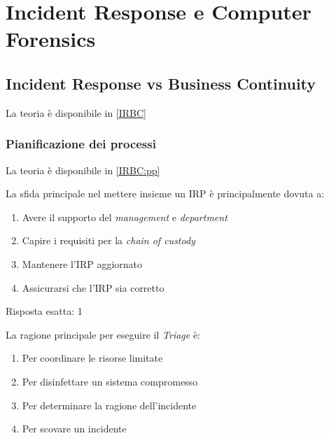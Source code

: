 \chapter{Incident Response e Computer Forensics}
\section{Incident Response vs Business Continuity}
\label{esIRBC}

La teoria \`e disponibile in \ref{IRBC}

\subsection{Pianificazione dei processi}
\label{esIRBC:pp}

La teoria \`e disponibile in \ref{IRBC:pp}



\begin{Exercise} [
  title={Quiz},
  label={esIRBC1}
  ]

  \Question La sfida principale nel mettere insieme un IRP \`e principalmente
dovuta a:
\begin{enumerate}
 \item Avere il supporto del \textit{management} e \textit{department}
 \item Capire i requisiti per la \textit{chain of custody}
 \item Mantenere l'IRP aggiornato
 \item Assicurarsi che l'IRP sia corretto
\end{enumerate}
\end{Exercise}

\begin{Answer} [
  ref={esIRBC1},
  number={1}
  ]

  \Question Risposta esatta: 1
\end{Answer}


\begin{Exercise} [
  title={Quiz},
  label={esIRBC2}
  ]

  \Question La ragione principale per eseguire il \textit{Triage} \`e:
  \begin{enumerate}
   \item Per coordinare le risorse limitate
   \item Per disinfettare un sistema compromesso
   \item Per determinare la ragione dell'incidente
   \item Per scovare un incidente
  \end{enumerate}

\end{Exercise}

